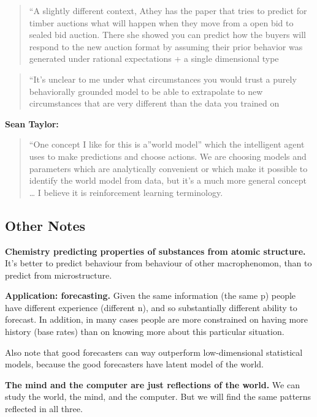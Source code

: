 \documentclass[
  10pt,
  letterpaper,
  DIV=11,
  numbers=noendperiod,
  oneside]{scrartcl}
\begin{document}
\begin{quote}
``A slightly different context, Athey has the paper that tries to
predict for timber auctions what will happen when they move from a open
bid to sealed bid auction. There she showed you can predict how the
buyers will respond to the new auction format by assuming their prior
behavior was generated under rational expectations + a single
dimensional type
\end{quote}

\begin{quote}
``It's unclear to me under what circumstances you would trust a purely
behaviorally grounded model to be able to extrapolate to new
circumstances that are very different than the data you trained on
\end{quote}

\textbf{Sean Taylor:}

\begin{quote}
``One concept I like for this is a''world model'' which the intelligent
agent uses to make predictions and choose actions. We are choosing
models and parameters which are analytically convenient or which make it
possible to identify the world model from data, but it's a much more
general concept \ldots{} I believe it is reinforcement learning
terminology.
\end{quote}

\subsection{Other Notes}\label{other-notes}

\textbf{Chemistry predicting properties of substances from atomic
structure.} It's better to predict behaviour from behaviour of other
macrophenomon, than to predict from microstructure.

\textbf{Application: forecasting.} Given the same information (the same
p) people have different experience (different n), and so substantially
different ability to forecast. In addition, in many cases people are
more constrained on having more history (base rates) than on knowing
more about this particular situation.

Also note that good forecasters can way outperform low-dimensional
statistical models, because the good forecasters have latent model of
the world.

\textbf{The mind and the computer are just reflections of the world.} We
can study the world, the mind, and the computer. But we will find the
same patterns reflected in all three.
\end{document}
